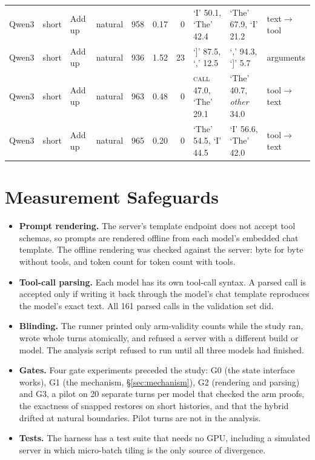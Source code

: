 \begin{table}[p]
\begin{tabular}{@{}llllrrrlll@{}}
Qwen3 & short & Add up & natural & 958 & 0.17 & 0 & `I' 50.1, `The' 42.4 & `The' 67.9, `I' 21.2 & text$\to$tool \\
Qwen3 & short & Add up & natural & 936 & 1.52 & 23 & `]' 87.5, `,' 12.5 & `,' 94.3, `]' 5.7 & arguments \\
Qwen3 & short & Add up & natural & 963 & 0.48 & 0 & \textsc{call} 47.0, `The' 29.1 & `The' 40.7, \textit{other} 34.0 & tool$\to$text \\
Qwen3 & short & Add up & natural & 965 & 0.20 & 0 & `The' 54.5, `I' 44.5 & `I' 56.6, `The' 42.0 & tool$\to$text \\
\bottomrule
\end{tabular}
\end{table}

\section{Measurement Safeguards}
\label{app:safeguards}

\begin{itemize}
\item \textbf{Prompt rendering.} The server's template endpoint does not accept
  tool schemas, so prompts are rendered offline from each model's embedded chat
  template. The offline rendering was checked against the server: byte for byte
  without tools, and token count for token count with tools.
\item \textbf{Tool-call parsing.} Each model has its own tool-call syntax. A
  parsed call is accepted only if writing it back through the model's chat
  template reproduces the model's exact text. All 161 parsed calls in the
  validation set did.
\item \textbf{Blinding.} The runner printed only arm-validity counts while the
  study ran, wrote whole turns atomically, and refused a server with a different
  build or model. The analysis script refused to run until all three models had
  finished.
\item \textbf{Gates.} Four gate experiments preceded the study: G0 (the state
  interface works), G1 (the mechanism, \S\ref{sec:mechanism}), G2 (rendering and
  parsing) and G3, a pilot on 20 separate turns per model that checked the arm
  proofs, the exactness of snapped restores on short histories, and that the
  hybrid drifted at natural boundaries. Pilot turns are not in the analysis.
\item \textbf{Tests.} The harness has a test suite that needs no GPU, including
  a simulated server in which micro-batch tiling is the only source of
  divergence.
\end{itemize}

